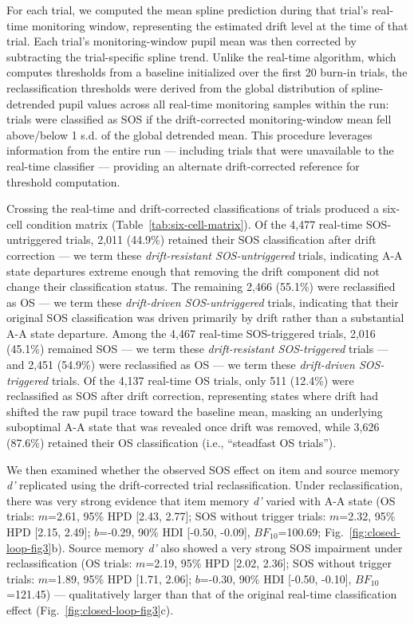 For each trial, we computed the mean spline prediction during that trial's real-time monitoring window, representing the estimated drift level at the time of that trial. Each trial's monitoring-window pupil mean was then corrected by subtracting the trial-specific spline trend. Unlike the real-time algorithm, which computes thresholds from a baseline initialized over the first 20 burn-in trials, the reclassification thresholds were derived from the global distribution of spline-detrended pupil values across all real-time monitoring samples within the run: trials were classified as SOS if the drift-corrected monitoring-window mean fell above/below 1 s.d. of the global detrended mean. This procedure leverages information from the entire run — including trials that were unavailable to the real-time classifier — providing an alternate drift-corrected reference for threshold computation.

Crossing the real-time and drift-corrected classifications of trials produced a six-cell condition matrix (Table~\ref{tab:six-cell-matrix}). Of the 4,477 real-time SOS-untriggered trials, 2,011 (44.9\%) retained their SOS classification after drift correction — we term these \textit{drift-resistant SOS-untriggered} trials, indicating A-A state departures extreme enough that removing the drift component did not change their classification status. The remaining 2,466 (55.1\%) were reclassified as OS — we term these \textit{drift-driven SOS-untriggered} trials, indicating that their original SOS classification was driven primarily by drift rather than a substantial A-A state departure. Among the 4,467 real-time SOS-triggered trials, 2,016 (45.1\%) remained SOS — we term these \textit{drift-resistant SOS-triggered} trials — and 2,451 (54.9\%) were reclassified as OS — we term these \textit{drift-driven SOS-triggered} trials. Of the 4,137 real-time OS trials, only 511 (12.4\%) were reclassified as SOS after drift correction, representing states where drift had shifted the raw pupil trace toward the baseline mean, masking an underlying suboptimal A-A state that was revealed once drift was removed, while 3,626 (87.6\%) retained their OS classification (i.e., ``steadfast OS trials'').

We then examined whether the observed SOS effect on item and source memory \textit{d'} replicated using the drift-corrected trial reclassification. Under reclassification, there was very strong evidence that item memory \textit{d'} varied with A-A state (OS trials: $m$=2.61, 95\% HPD [2.43, 2.77]; SOS without trigger trials: $m$=2.32, 95\% HPD [2.15, 2.49]; $b$=-0.29, 90\% HDI [-0.50, -0.09], $BF_{10}$=100.69; Fig.~\ref{fig:closed-loop-fig3}b). Source memory \textit{d'} also showed a very strong SOS impairment under reclassification (OS trials: $m$=2.19, 95\% HPD [2.02, 2.36]; SOS without trigger trials: $m$=1.89, 95\% HPD [1.71, 2.06];  $b$=-0.30, 90\% HDI [-0.50, -0.10], $BF_{10}$=121.45) — qualitatively larger than that of the original real-time classification effect (Fig.~\ref{fig:closed-loop-fig3}c).

